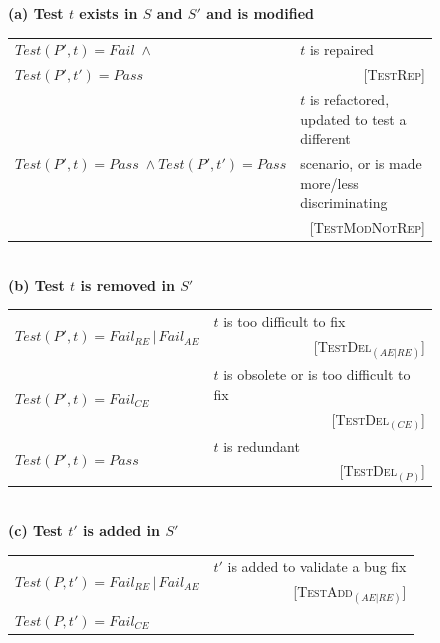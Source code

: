 \documentclass[conference]{IEEEtran}
\newcommand{\mt}{\mathit}
\newcommand{\pass}{\mt{Pass}}
\newcommand{\fail}{\mt{Fail}}
\newcommand{\failce}{\mt{Fail}_{CE}}
\newcommand{\failre}{\mt{Fail}_{RE}}
\newcommand{\failae}{\mt{Fail}_{AE}}
\newcommand{\testfunc}[2]{\mt{Test(#1, #2)}}
\newcommand{\catrep}{\textsc{TestRep}}
\newcommand{\catref}{\textsc{TestModNotRep}}
\newcommand{\catdelaere}{\textsc{TestDel}$_\mt{(AE|RE)}$}
\newcommand{\catdelce}{\textsc{TestDel}$_\mt{(CE)}$}
\newcommand{\catdelp}{\textsc{TestDel}$_\mt{(P)}$}
\newcommand{\cataddaere}{\textsc{TestAdd}$_\mt{(AE|RE)}$}
\begin{document}
\begin{figure}[t]
\centering
\footnotesize
\tabcolsep=3pt
\textbf{(a) Test $t$ exists in $S$ and $S'$ and is modified}
\\ [2pt]
\begin{tabular}{|l||l|}
\hline
$\testfunc{P'}{t} = \fail \; \wedge$ &
$t$ is repaired \\
$\testfunc{P'}{t'} = \pass$ &
\multicolumn{1}{r|}{\scriptsize [\catrep{}]}\\
\hline
\multirow{3}{28mm}{$\testfunc{P'}{t} = \pass \; \wedge \testfunc{P'}{t'} = \pass$} &
$t$ is refactored, updated to test a different \\
& scenario, or is made more/less discriminating \\
& \multicolumn{1}{r|}{\scriptsize [\catref{}]} \\
\hline
\end{tabular}
\\ [8pt]
%
\textbf{(b) Test $t$ is removed in $S'$}
\\ [2pt]
\begin{tabular}{|l||l|}
\hline
\multirow{2}{*}{$\testfunc{P'}{t} = \failre \, | \, \failae$} &
$t$ is too difficult to fix \\
& \multicolumn{1}{r|}{\scriptsize [\catdelaere{}]} \\
\hline
\multirow{2}{*}{$\testfunc{P'}{t} = \failce$} & $t$ is obsolete or is
too difficult to fix \\
& \multicolumn{1}{r|}{\scriptsize [\catdelce{}]} \\
\hline
\multirow{2}{*}{$\testfunc{P'}{t} = \pass$} & $t$ is redundant \\
& \multicolumn{1}{r|}{\scriptsize [\catdelp{}]} \\
\hline 
\end{tabular}
\\ [8pt]
%
\textbf{(c) Test $t'$ is added in $S'$}
\\ [2pt]
\begin{tabular}{|l||l|}
  \hline
  \multirow{2}{*}{$\testfunc{P}{t'} = \failre \, | \, \failae$} &
  $t'$ is added to validate a bug fix \\
  & \multicolumn{1}{r|}{\scriptsize [\cataddaere{}]} \\
  \hline
  \multirow{3}{*}{$\testfunc{P}{t'} = \failce$} &

\end{tabular}
\end{figure}
\end{document}
